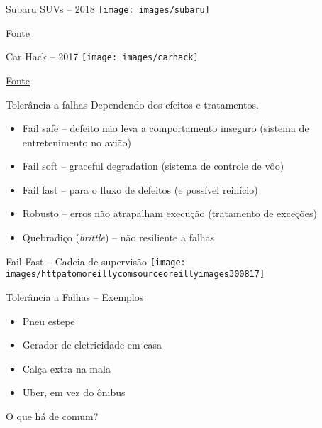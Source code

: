 \begin{frame}{Subaru SUVs -- 2018}
\texttt{[image: images/subaru]}

\href{https://spectrum.ieee.org/riskfactor/computing/it/coding-error-leads-293-subaru-ascents-to-the-car-crusher}{Fonte}
\end{frame}

\begin{frame}{Car Hack -- 2017}
\texttt{[image: images/carhack]}

\href{https://www.wired.com/story/car-hack-shut-down-safety-features/}{Fonte}
\end{frame}




\begin{frame}{Tolerância a falhas}
Dependendo dos efeitos e tratamentos.
\begin{itemize}
	\item Fail safe -- defeito não leva a comportamento inseguro (sistema de entretenimento no avião)
	\item Fail soft -- graceful degradation (sistema de controle de vôo)
	\item Fail fast -- para o fluxo de defeitos (e possível reinício)

\vspace{1cm}

	\item Robusto -- erros não atrapalham execução (tratamento de exceções)
	\item Quebradiço (\emph{brittle}) -- não resiliente a falhas
	
\end{itemize}
\end{frame}


\begin{frame}{Fail Fast -- Cadeia de supervisão}
\texttt{[image: images/httpatomoreillycomsourceoreillyimages300817]}
\end{frame}


\begin{frame}{Tolerância a Falhas -- Exemplos}
\begin{itemize}
	\item Pneu estepe
	\item Gerador de eletricidade em casa
	\item Calça extra na mala
	\item Uber, em vez do ônibus
\end{itemize}
\pause O que há de comum?
\end{frame}

